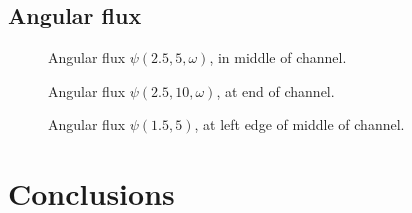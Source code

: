\documentclass{beamer}
\begin{document}
\subsection{Angular flux}
%  

\begin{frame}
\begin{figure}[tb]
  \centering
  
  \caption{Angular flux $\psi(2.5,5,\omega)$, in middle of channel.}
  \label{fig:psi5}
\end{figure}
\end{frame}

\begin{frame}
\begin{figure}[tb]
  \centering
  
  \caption{Angular flux $\psi(2.5,10,\omega)$, at end of channel.}
  \label{fig:psi10}
\end{figure}
\end{frame}

\begin{frame}
\begin{figure}[tb]
  \centering
  
  \caption{Angular flux $\psi(1.5,5)$, at left edge of middle of channel.}
  \label{fig:psiEdge}
\end{figure}
\end{frame}

\section{Conclusions}
\begin{frame}
\end{frame}
\end{document}
